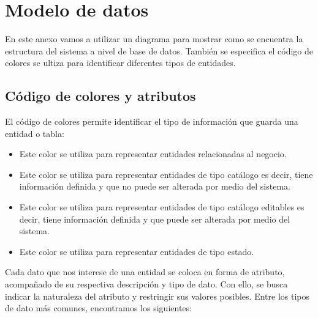 

\chapter{Modelo de datos}
En este anexo vamos a utilizar un diagrama para mostrar como se encuentra la estructura del sistema a nivel de base de datos. 
También se especifica el código de colores se ultiza para identificar diferentes tipos de entidades.

\section{Código de colores y atributos}

El código de colores permite identificar el tipo de información que guarda una entidad o tabla:


\begin{itemize}
    \item \IUEntidaB\hspace{0.2cm} Este color se utiliza para representar entidades relacionadas al negocio.
    \item \IUEntidaA\hspace{0.2cm} Este color se utiliza para representar entidades de tipo catálogo es decir, tiene información definida 
    y que no puede ser alterada por medio del sistema.
    \item \IUEntidaC\hspace{0.2cm} Este color se utiliza para representar entidades de tipo catálogo editables es decir, tiene información definida 
    y que puede ser alterada por medio del sistema.
    \item \IUEntidaD\hspace{0.2cm} Este color se utiliza para representar entidades de tipo estado.
\end{itemize}

Cada dato que nos interese de una entidad se coloca en forma de atributo, acompañado de su respectiva descripción y tipo de dato. Con ello, se busca indicar la naturaleza del atributo y restringir sus valores posibles. Entre los tipos de dato más comunes, encontramos los siguientes:

